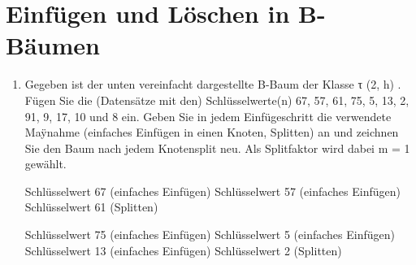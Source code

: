 \documentclass{lehramt-informatik-aufgabe}
\begin{document}


\section{Einfügen und Löschen in B-Bäumen
}
\begin{enumerate}

\item Gegeben ist der unten vereinfacht dargestellte B-Baum der Klasse τ (2,
h) . Fügen Sie die (Datensätze mit den) Schlüsselwerte(n) 67, 57, 61,
75, 5, 13, 2, 91, 9, 17, 10 und 8 ein. Geben Sie in jedem Einfügeschritt
die verwendete Maÿnahme (einfaches Einfügen in einen Knoten, Splitten)
an und zeichnen Sie den Baum nach jedem Knotensplit neu. Als Splitfaktor
wird dabei m = 1 gewählt.


\begin{liAntwort}

%

Schlüsselwert 67 (einfaches Einfügen)
Schlüsselwert 57 (einfaches Einfügen)
Schlüsselwert 61 (Splitten)


%

Schlüsselwert 75 (einfaches Einfügen)
Schlüsselwert 5 (einfaches Einfügen)
Schlüsselwert 13 (einfaches Einfügen)
Schlüsselwert 2 (Splitten)


\end{liAntwort}
\end{enumerate}
\end{document}
